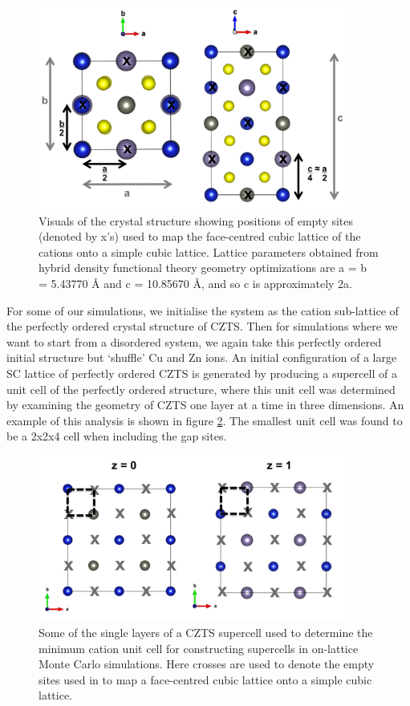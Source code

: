 \begin{figure}[h!]
  \centering
    \includegraphics[width=0.9\textwidth]{figures/CZTS_lattice_scaling.png}
    \caption{Visuals of the { \CZTS } crystal structure showing positions of empty sites (denoted by x's) used to map the face-centred cubic lattice of the cations onto a simple cubic lattice. Lattice parameters obtained from hybrid density functional theory geometry optimizations are a = b = 5.43770 {\AA} and c = 10.85670 \AA, and so c is approximately 2a.}
  \label{CZTS_lattice_scaling}
\end{figure}

For some of our simulations, we initialise the system as the cation sub-lattice of the perfectly ordered crystal structure of CZTS. Then for simulations where we want to start from a disordered system, we again take this perfectly ordered initial structure but `shuffle' Cu and Zn ions. An initial configuration of a large SC lattice of perfectly ordered CZTS is generated by producing a supercell of a unit cell of the perfectly ordered structure, where this unit cell was determined by examining the geometry of CZTS one layer at a time in three dimensions. An example of this analysis is shown in figure \ref{unit_cell_eris_supercell}. The smallest unit cell was found to be a 2x2x4 cell when including the gap sites. 

\begin{figure}[h!]
  \centering
    \includegraphics[width=0.9\textwidth]{figures/unit_cell_eris_supercell.png}
    \caption{Some of the single layers of a CZTS supercell used to determine the minimum cation unit cell for constructing supercells in on-lattice Monte Carlo simulations. Here crosses are used to denote the empty sites used in to map a face-centred cubic lattice onto a simple cubic lattice.}
  \label{unit_cell_eris_supercell}
\end{figure}


